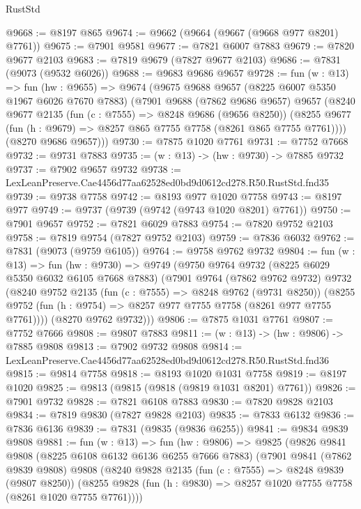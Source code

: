 \begin{lexlean}{RustStd}
\begin{coremodule}
@9668 := @8197 @865
@9674 := @9662 (@9664 (@9667 (@9668 @977 @8201) @7761))
@9675 := @7901 @9581
@9677 := @7821 @6007 @7883
@9679 := @7820 @9677 @2103
@9683 := @7819 @9679 (@7827 @9677 @2103)
@9686 := @7831 (@9073 (@9532 @6026))
@9688 := @9683 @9686 @9657
@9728 := fun (w : @13) =>
  fun (hw : @9655) =>
  @9674
    (@9675
      @9688
      @9657
      (@8225 @6007 @5350 @1967 @6026 @7670 @7883)
      (@7901
        @9688
        (@7862 @9686 @9657)
        @9657
        (@8240
          @9677
          @2135
          (fun (c : @7555) => @8248 @9686 (@9656 @8250))
          (@8255 @9677 (fun (h : @9679) => @8257 @865 @7755 @7758 (@8261 @865 @7755 @7761))))
        (@8270 @9686 @9657)))
@9730 := @7875 @1020 @7761
@9731 := @7752 @7668
@9732 := @9731 @7883
@9735 := (w : @13) -> (hw : @9730) -> @7885 @9732
@9737 := @7902 @9657 @9732
@9738 := LexLeanPreserve.Cae4456d77aa62528ed0bd9d0612cd278.R50.RustStd.fnd35
@9739 := @9738 @7758
@9742 := @8193 @977 @1020 @7758
@9743 := @8197 @977
@9749 := @9737 (@9739 (@9742 (@9743 @1020 @8201) @7761))
@9750 := @7901 @9657
@9752 := @7821 @6029 @7883
@9754 := @7820 @9752 @2103
@9758 := @7819 @9754 (@7827 @9752 @2103)
@9759 := @7836 @6032
@9762 := @7831 (@9073 (@9759 @6105))
@9764 := @9758 @9762 @9732
@9804 := fun (w : @13) =>
  fun (hw : @9730) =>
  @9749
    (@9750
      @9764
      @9732
      (@8225 @6029 @5350 @6032 @6105 @7668 @7883)
      (@7901
        @9764
        (@7862 @9762 @9732)
        @9732
        (@8240
          @9752
          @2135
          (fun (c : @7555) => @8248 @9762 (@9731 @8250))
          (@8255 @9752 (fun (h : @9754) => @8257 @977 @7755 @7758 (@8261 @977 @7755 @7761))))
        (@8270 @9762 @9732)))
@9806 := @7875 @1031 @7761
@9807 := @7752 @7666
@9808 := @9807 @7883
@9811 := (w : @13) -> (hw : @9806) -> @7885 @9808
@9813 := @7902 @9732 @9808
@9814 := LexLeanPreserve.Cae4456d77aa62528ed0bd9d0612cd278.R50.RustStd.fnd36
@9815 := @9814 @7758
@9818 := @8193 @1020 @1031 @7758
@9819 := @8197 @1020
@9825 := @9813 (@9815 (@9818 (@9819 @1031 @8201) @7761))
@9826 := @7901 @9732
@9828 := @7821 @6108 @7883
@9830 := @7820 @9828 @2103
@9834 := @7819 @9830 (@7827 @9828 @2103)
@9835 := @7833 @6132
@9836 := @7836 @6136
@9839 := @7831 (@9835 (@9836 @6255))
@9841 := @9834 @9839 @9808
@9881 := fun (w : @13) =>
  fun (hw : @9806) =>
  @9825
    (@9826
      @9841
      @9808
      (@8225 @6108 @6132 @6136 @6255 @7666 @7883)
      (@7901
        @9841
        (@7862 @9839 @9808)
        @9808
        (@8240
          @9828
          @2135
          (fun (c : @7555) => @8248 @9839 (@9807 @8250))
          (@8255 @9828 (fun (h : @9830) => @8257 @1020 @7755 @7758 (@8261 @1020 @7755 @7761))))

\end{coremodule}
\end{lexlean}
